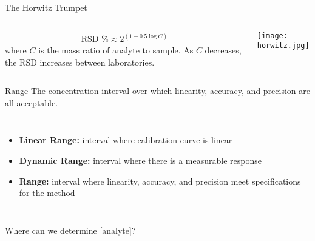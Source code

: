 \documentclass[notes=show]{beamer}
\begin{document}
\begin{frame}{The Horwitz Trumpet}
	\begin{columns}
		\begin{align*}
			\text{RSD \%} \approx 2^{(1-0.5 \log C)}
		\end{align*}
		where $C$ is the mass ratio of analyte to sample. As $C$
		decreases, the RSD increases between laboratories.
		\begin{center}
			\texttt{[image: horwitz.jpg]}
		\end{center}
	\end{columns}
\end{frame}

\begin{frame}{Range}
	The concentration interval over which linearity, accuracy, and precision
	are all acceptable.

	\begin{columns}
	\column{0.5\linewidth}
	\begin{itemize}
		\item \textbf{Linear Range:} interval where calibration curve is
			linear
		\item \textbf{Dynamic Range:} interval where there is a
			measurable response
		\item \textbf{Range:} interval where linearity, accuracy, and
			precision meet \alert{specifications} for the method
	\end{itemize}
	\column{0.5\linewidth}
\end{columns}

\end{frame}

\begin{frame}{Where can we determine [analyte]?}
	\begin{center}

	\end{center}
\end{frame}
\end{document}
